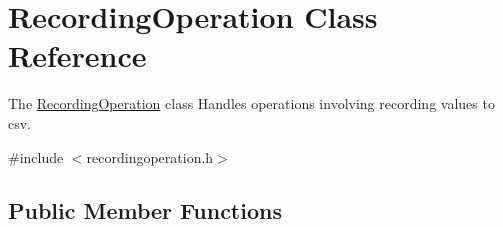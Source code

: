 \hypertarget{class_recording_operation}{}\section{Recording\+Operation Class Reference}
\label{class_recording_operation}


The \hyperlink{class_recording_operation}{Recording\+Operation} class Handles operations involving recording values to csv.  




{\ttfamily \#include $<$recordingoperation.\+h$>$}

\subsection*{Public Member Functions}
